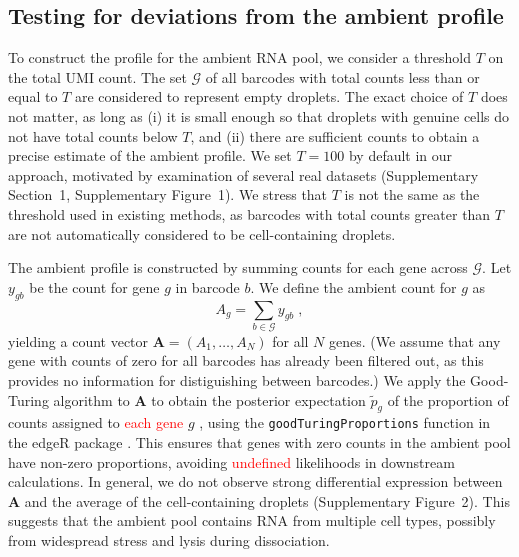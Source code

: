 \documentclass[10pt,letterpaper]{article}
\newcommand{\code}[1]{\texttt{#1}}
\newcommand{\revised}[1]{\textcolor{red}{#1}}
\newcommand{\suppfignegative}{1}
\newcommand{\suppfigambientma}{2}
\newcommand{\suppsecthreshold}{1}
\begin{document}
\subsection*{Testing for deviations from the ambient profile}
To construct the profile for the ambient RNA pool, we consider a threshold $T$ on the total UMI count.
The set $\mathcal{G}$ of all barcodes with total counts less than or equal to $T$ are considered to represent empty droplets.
The exact choice of $T$ does not matter, as long as (i) it is small enough so that droplets with genuine cells do not have total counts below $T$,
and (ii) there are sufficient counts to obtain a precise estimate of the ambient profile.
We set $T=100$ by default in our approach, motivated by examination of several real datasets (Supplementary Section~\suppsecthreshold{}, Supplementary Figure~\suppfignegative{}).
We stress that $T$ is not the same as the threshold used in existing methods, as barcodes with total counts greater than $T$ are not automatically considered to be cell-containing droplets.

The ambient profile is constructed by summing counts for each gene across $\mathcal{G}$.
Let $y_{gb}$ be the count for gene $g$ in barcode $b$.
We define the ambient count for $g$ as 
\[
    A_{g} = \sum_{b \in \mathcal{G}} y_{gb} \;,
\]
yielding a count vector $\mathbf{A} = (A_1, \dots, A_N)$ for all $N$ genes.
(We assume that any gene with counts of zero for all barcodes has already been filtered out, as this provides no information for distiguishing between barcodes.)
We apply the Good-Turing algorithm to $\mathbf{A}$ to obtain the posterior expectation $\tilde{p}_g$ of the proportion of counts assigned to \revised{each gene} $g$ \cite{gale1995good}, using the \code{goodTuringProportions} function in the \textsf{edgeR} package \cite{robinson2010edgeR}.
This ensures that genes with zero counts in the ambient pool have non-zero proportions, avoiding \revised{undefined} likelihoods in downstream calculations.
In general, we do not observe strong differential expression between $\mathbf{A}$ and the average of the cell-containing droplets (Supplementary Figure~\suppfigambientma{}).
This suggests that the ambient pool contains RNA from multiple cell types, possibly from widespread stress and lysis during dissociation.
\end{document}
